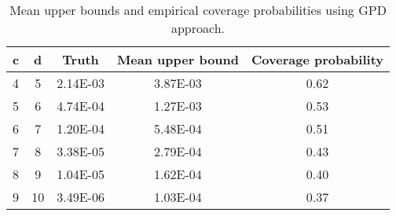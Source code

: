 \begin{table}[ht]
\centering
\begin{tabular}{ccccc}
  \hline
c & d & Truth & Mean upper bound & Coverage probability \\ 
  \hline
  4 &   5 & 2.14E-03 & 3.87E-03 & 0.62 \\ 
    5 &   6 & 4.74E-04 & 1.27E-03 & 0.53 \\ 
    6 &   7 & 1.20E-04 & 5.48E-04 & 0.51 \\ 
    7 &   8 & 3.38E-05 & 2.79E-04 & 0.43 \\ 
    8 &   9 & 1.04E-05 & 1.62E-04 & 0.40 \\ 
    9 &  10 & 3.49E-06 & 1.03E-04 & 0.37 \\ 
   \hline
\end{tabular}
\caption{Mean upper bounds and empirical coverage probabilities using GPD approach.} 
\label{Tab:robustnessGPD}
\end{table}
